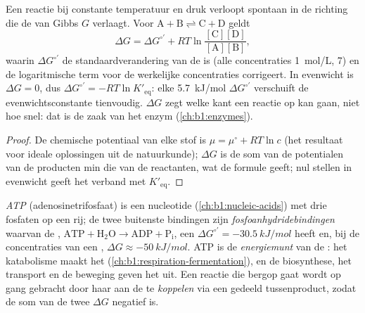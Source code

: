 \begin{proposition}\label{prop:b1:water-small-molecules:gibbs}
Een reactie bij constante temperatuur en druk verloopt spontaan in de richting die
de  van Gibbs $G$ verlaagt. Voor
$\mathrm{A} + \mathrm{B} \rightleftharpoons \mathrm{C} + \mathrm{D}$ geldt
\[
\Delta G = \Delta G^{\circ\prime} + RT\ln\frac{[\mathrm{C}][\mathrm{D}]}{[\mathrm{A}][\mathrm{B}]},
\]
waarin $\Delta G^{\circ\prime}$ de standaardverandering van de  is
(alle concentraties \qty{1}{mol/L},  7) en de logaritmische term voor de
werkelijke concentraties corrigeert. In evenwicht is $\Delta G = 0$, dus
$\Delta G^{\circ\prime} = -RT\ln K'_{\text{eq}}$: elke \qty{5.7}{kJ/mol}
$\Delta G^{\circ\prime}$ verschuift de evenwichtsconstante tienvoudig.
$\Delta G$ zegt welke kant een reactie op kan gaan, niet hoe snel: dat is de zaak
van het enzym (\cref{ch:b1:enzymes}).
\end{proposition}
\begin{proof}
De chemische potentiaal van elke stof is $\mu = \mu^\circ + RT\ln c$ (het
resultaat voor ideale oplossingen uit de natuurkunde); $\Delta G$ is de som van de
potentialen van de producten min die van de reactanten, wat de formule geeft;
nul stellen in evenwicht geeft het verband met $K'_{\text{eq}}$.
\end{proof}

\begin{definition}\label{def:b1:water-small-molecules:atp}
\emph{ATP} (adenosinetrifosfaat) is een nucleotide
(\cref{ch:b1:nucleic-acids}) met drie fosfaten op een rij; de twee buitenste
bindingen zijn \emph{fosfoanhydridebindingen}
waarvan de , $\mathrm{ATP} + \mathrm{H_2O} \to \mathrm{ADP} +
\mathrm{P_i}$, een $\Delta G^{\circ\prime} = \qty{-30.5}{kJ/mol}$ heeft en, bij
de concentraties van een , $\Delta G \approx \qty{-50}{kJ/mol}$. ATP is de
\emph{energiemunt} van de : het katabolisme maakt het
(\cref{ch:b1:respiration-fermentation}), en de biosynthese, het transport en de
beweging geven het uit. Een reactie die bergop gaat wordt op gang gebracht door
haar aan de  te \emph{koppelen} via een
gedeeld tussenproduct, zodat de som van de twee $\Delta G$ negatief is.
\end{definition}

